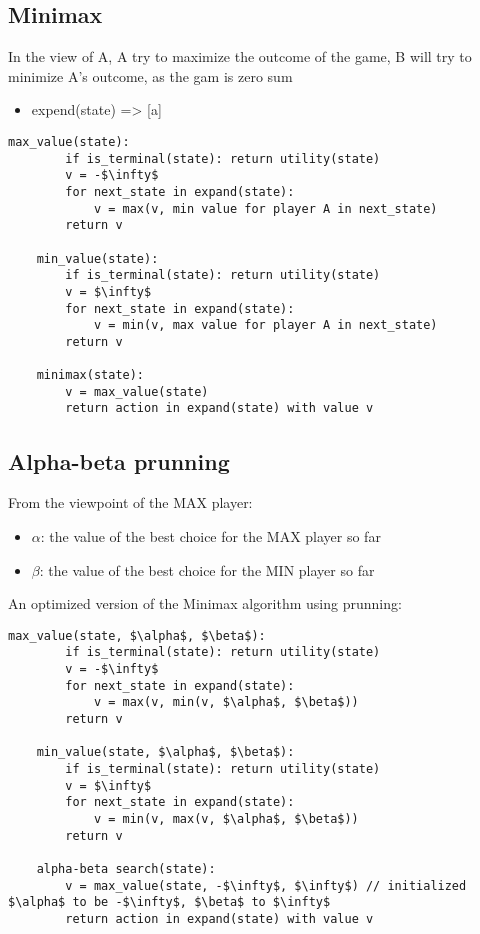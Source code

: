 \documentclass{article}
\begin{document}
\subsection{Minimax}
In the view of A, A try to maximize the outcome of the game, B will try to minimize A's outcome, as the gam is zero sum\newline
\begin{itemize}
    \item expend(state) => [a]
    

\end{itemize}
\begin{lstlisting}[mathescape=true]
    max_value(state):
        if is_terminal(state): return utility(state)
        v = -$\infty$
        for next_state in expand(state):
            v = max(v, min value for player A in next_state)
        return v
    
    min_value(state):
        if is_terminal(state): return utility(state)
        v = $\infty$
        for next_state in expand(state):
            v = min(v, max value for player A in next_state)
        return v

    minimax(state): 
        v = max_value(state)
        return action in expand(state) with value v
\end{lstlisting}

\subsection{Alpha-beta prunning}
From the viewpoint of the MAX player:
\begin{itemize}
    \item $\alpha$: the value of the best choice for the MAX player so far
    \item $\beta$: the value of the best choice for the MIN player so far
\end{itemize}
An optimized version of the Minimax algorithm using prunning:
\begin{lstlisting}[mathescape=true]
    max_value(state, $\alpha$, $\beta$):
        if is_terminal(state): return utility(state)
        v = -$\infty$
        for next_state in expand(state):
            v = max(v, min(v, $\alpha$, $\beta$))
        return v
    
    min_value(state, $\alpha$, $\beta$):
        if is_terminal(state): return utility(state)
        v = $\infty$
        for next_state in expand(state):
            v = min(v, max(v, $\alpha$, $\beta$))
        return v

    alpha-beta search(state): 
        v = max_value(state, -$\infty$, $\infty$) // initialized $\alpha$ to be -$\infty$, $\beta$ to $\infty$
        return action in expand(state) with value v
\end{lstlisting}
\end{document}
